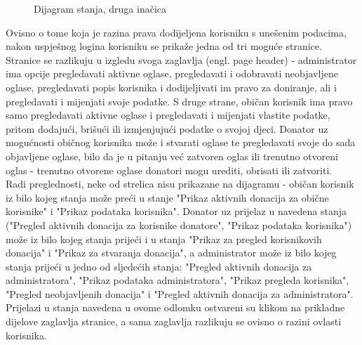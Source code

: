                 \begin{figure}[H]
				\centering
				\caption{Dijagram stanja, druga inačica}
				\label{fig:StateDiagramv2}
			\end{figure}
                 Ovisno o tome koja je razina prava dodijeljena korisniku s unešenim podacima, nakon uspješnog logina korisniku se prikaže jedna od tri moguće stranice. Stranice se razlikuju u izgledu svoga zaglavlja (engl. page header) - administrator ima opcije pregledavati aktivne oglase, pregledavati i odobravati neobjavljene oglase, pregledavati popis korisnika i dodijeljivati im pravo za doniranje, ali i pregledavati i mijenjati svoje podatke. S druge strane, običan korisnik ima pravo samo pregledavati aktivne oglase i pregledavati i mijenjati vlastite podatke, pritom dodajući, brišući ili izmjenjujući podatke o svojoj djeci. Donator uz mogućnosti običnog korisnika može i stvarati oglase te pregledavati svoje do sada objavljene oglase, bilo da je u pitanju već zatvoren oglas ili trenutno otvoreni oglas - trenutno otvorene oglase donatori mogu urediti, obrisati ili zatvoriti. \\
                 
                 Radi preglednosti, neke od strelica nisu prikazane na dijagramu - običan korisnik iz bilo kojeg stanja može preći u stanje "Prikaz aktivnih donacija za obične korisnike" i  "Prikaz podataka korisnika". Donator uz prijelaz u navedena stanja ("Pregled aktivnih donacija za korisnike donatore", "Prikaz podataka korisnika") može iz bilo kojeg stanja prijeći i u stanja "Prikaz za pregled korisnikovih donacija" i "Prikaz za stvaranja donacija", a administrator može iz bilo kojeg stanja prijeći u jedno od sljedećih stanja: "Pregled aktivnih donacija za administratora", "Prikaz podataka administratora", "Prikaz pregleda korisnika", "Pregled neobjavljenih donacija" i "Pregled aktivnih donacija za administratora". Prijelazi u stanja navedena u ovome odlomku ostvareni su klikom na prikladne dijelove zaglavlja stranice, a sama zaglavlja razlikuju se ovisno o razini ovlasti korisnika.\\

